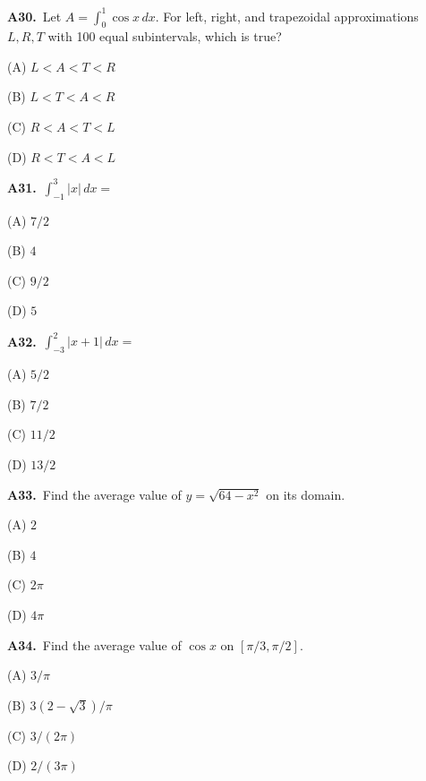 \documentclass[11pt]{article}
\begin{document}
\bigskip\noindent\textbf{A30.}\ Let $A=\int_0^1\cos x\,dx$. For left, right, and trapezoidal approximations $L,R,T$ with 100 equal subintervals, which is true?
\begin{list}{}{\setlength{\leftmargin}{3em}\setlength{\labelwidth}{2.5em}\setlength{\itemsep}{0pt}\setlength{\topsep}{2pt}}
\item[(A)] $L<A<T<R$
\item[(B)] $L<T<A<R$
\item[(C)] $R<A<T<L$
\item[(D)] $R<T<A<L$
\end{list}

\bigskip\noindent\textbf{A31.}\ $\int_{-1}^3|x|\,dx=$
\begin{list}{}{\setlength{\leftmargin}{3em}\setlength{\labelwidth}{2.5em}\setlength{\itemsep}{0pt}\setlength{\topsep}{2pt}}
\item[(A)] $7/2$
\item[(B)] $4$
\item[(C)] $9/2$
\item[(D)] $5$
\end{list}

\bigskip\noindent\textbf{A32.}\ $\int_{-3}^2|x+1|\,dx=$
\begin{list}{}{\setlength{\leftmargin}{3em}\setlength{\labelwidth}{2.5em}\setlength{\itemsep}{0pt}\setlength{\topsep}{2pt}}
\item[(A)] $5/2$
\item[(B)] $7/2$
\item[(C)] $11/2$
\item[(D)] $13/2$
\end{list}

\bigskip\noindent\textbf{A33.}\ Find the average value of $y=\sqrt{64-x^2}$ on its domain.
\begin{list}{}{\setlength{\leftmargin}{3em}\setlength{\labelwidth}{2.5em}\setlength{\itemsep}{0pt}\setlength{\topsep}{2pt}}
\item[(A)] $2$
\item[(B)] $4$
\item[(C)] $2\pi$
\item[(D)] $4\pi$
\end{list}

\bigskip\noindent\textbf{A34.}\ Find the average value of $\cos x$ on $[\pi/3,\pi/2]$.
\begin{list}{}{\setlength{\leftmargin}{3em}\setlength{\labelwidth}{2.5em}\setlength{\itemsep}{0pt}\setlength{\topsep}{2pt}}
\item[(A)] $3/\pi$
\item[(B)] $3(2-\sqrt3)/\pi$
\item[(C)] $3/(2\pi)$
\item[(D)] $2/(3\pi)$
\end{list}
\end{document}
